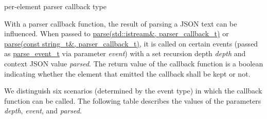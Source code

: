 per-\/element parser callback type 

With a parser callback function, the result of parsing a J\+S\+ON text can be influenced. When passed to \hyperlink{a00025_a13c4d2ab4e7ee2f92be785a7b12948ff}{parse(std\+::istream\&, parser\+\_\+callback\+\_\+t)} or \hyperlink{a00025_a35303ad045a06c2a79dc28ac29652e86}{parse(const string\+\_\+t\&, parser\+\_\+callback\+\_\+t)}, it is called on certain events (passed as \hyperlink{a00025_aea1c863b719b4ca5b77188c171bbfafe}{parse\+\_\+event\+\_\+t} via parameter {\itshape event}) with a set recursion depth {\itshape depth} and context J\+S\+ON value {\itshape parsed}. The return value of the callback function is a boolean indicating whether the element that emitted the callback shall be kept or not.

We distinguish six scenarios (determined by the event type) in which the callback function can be called. The following table describes the values of the parameters {\itshape depth}, {\itshape event}, and {\itshape parsed}.

